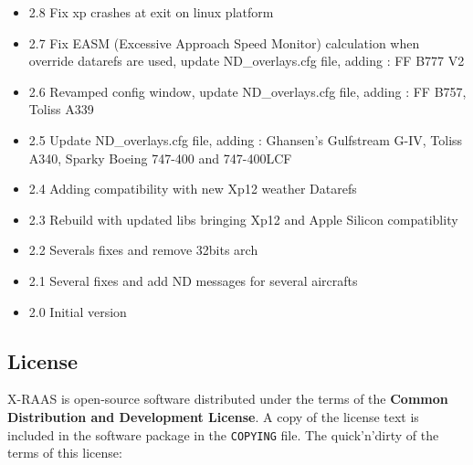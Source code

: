 \documentclass[a4paper,12pt]{article}
\begin{document}
\begin{itemize}

\item 2.8 Fix xp crashes at exit on linux platform

\item 2.7 Fix EASM (Excessive Approach Speed Monitor) calculation when override datarefs are used, update ND\_overlays.cfg file, adding : FF B777 V2

\item 2.6 Revamped config window, update ND\_overlays.cfg file, adding : FF B757, Toliss A339

\item 2.5 Update ND\_overlays.cfg file, adding : Ghansen's Gulfstream G-IV, Toliss A340, Sparky Boeing 747-400 and 747-400LCF

\item 2.4 Adding compatibility with new Xp12 weather Datarefs

\item 2.3 Rebuild with updated libs bringing Xp12 and Apple Silicon compatiblity

\item 2.2 Severals fixes and remove 32bits arch

\item 2.1 Several fixes and add ND messages for several aircrafts

\item 2.0 Initial version

\end{itemize}


\subsection{License}

X-RAAS is open-source software distributed under the terms of the
\textbf{Common Distribution and Development License}. A copy of the
license text is included in the software package in the \texttt{COPYING}
file. The quick'n'dirty of the terms of this license:
\end{document}
